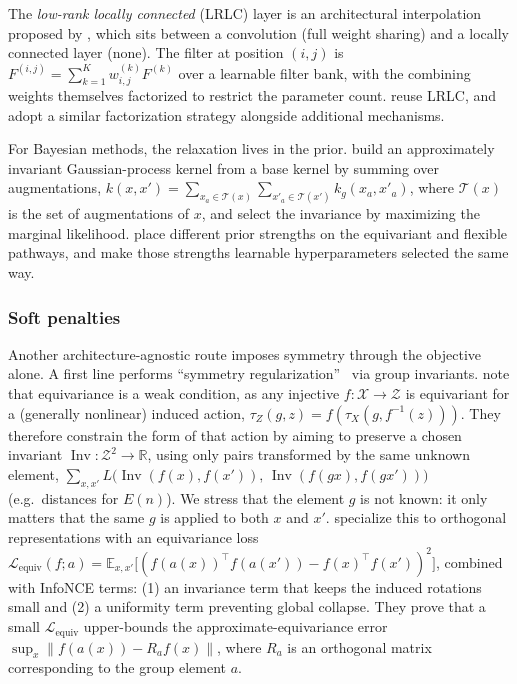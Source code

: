 \documentclass[mathematics,review,submit,moreauthors]{Definitions/mdpi}
\begin{document}
The \emph{low-rank locally connected} (LRLC) layer is an architectural interpolation proposed by \citet{elsayed2020p3icml}, which sits between a convolution (full weight sharing) and a locally connected layer (none).
The filter at position $(i,j)$ is $F^{(i,j)}=\sum_{k=1}^{K}w^{(k)}_{i,j}F^{(k)}$ over a learnable filter bank, with the combining weights themselves factorized to restrict the parameter count.
\citet{zhou2021} reuse LRLC, and \citet{ouderaa2023} adopt a similar factorization strategy alongside additional mechanisms. 

For Bayesian methods, the relaxation lives in the prior.
\citet{vanderwilk2018anips} build an approximately invariant Gaussian-process kernel from a base kernel by summing over augmentations, $k(x,x')=\sum_{x_a\in\mathcal{T}(x)}\sum_{x'_a\in\mathcal{T}(x')}k_g(x_a,x'_a)$, where $\mathcal{T}(x)$ is the set of augmentations of $x$, and select the invariance by maximizing the marginal likelihood.
\citet{finzi2021anips} place different prior strengths on the equivariant and flexible pathways, and \citet{ouderaa2023} make those strengths learnable hyperparameters selected the same way.

\subsubsection{Soft penalties}\label{sec:approx-soft}
Another architecture-agnostic route imposes symmetry through the objective alone.
A first line performs ``symmetry regularization''~\citep{shakerinava2022anips} via group invariants.
\citet{shakerinava2022anips} note that equivariance is a weak condition, as any injective $f:\mathcal{X}\to \mathcal{Z}$ is equivariant for a (generally nonlinear) induced action, $\tau_Z(g,z)=f(\tau_X(g,f^{-1}(z)))$.
They therefore constrain the form of that action by aiming to preserve a chosen invariant $\operatorname{Inv}:\mathcal{Z}^2\to\mathbb{R}$, using only pairs transformed by the same unknown element, $\sum_{x, x'} L\big(\operatorname{Inv}(f(x),f(x')),\,\operatorname{Inv}(f(gx),f(gx'))\big)$ (e.g.\ distances for $E(n)$).
We stress that the element $g$ is not known: it only matters that the same $g$ is applied to both $x$ and $x'$.
\citet{gupta2023a} specialize this to orthogonal representations with an equivariance loss $\mathcal{L}_{\mathrm{equiv}}(f;a)=\mathbb{E}_{x,x'}\big[(f(a(x))^\top f(a(x'))-f(x)^\top f(x'))^2\big]$, combined with InfoNCE terms: (1) an invariance term that keeps the induced rotations small and (2) a uniformity term preventing global collapse.
They prove that a small $\mathcal{L}_{\mathrm{equiv}}$ upper-bounds the approximate-equivariance error $\sup_x\|f(a(x))-R_a f(x)\|$, where $R_a$ is an orthogonal matrix corresponding to the group element $a$.
\end{document}
